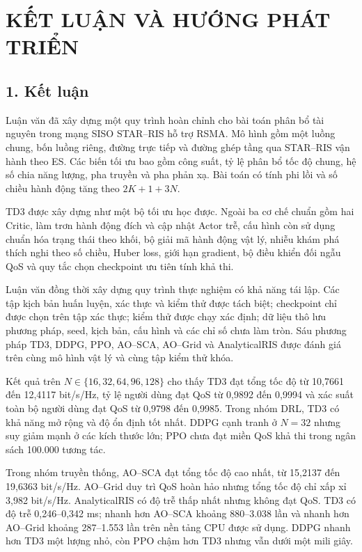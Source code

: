 \chapter*{KẾT LUẬN VÀ HƯỚNG PHÁT TRIỂN}

\section*{1. Kết luận}
Luận văn đã xây dựng một quy trình hoàn chỉnh cho bài toán phân bổ tài nguyên trong mạng SISO STAR--RIS hỗ trợ RSMA. Mô hình gồm một luồng chung, bốn luồng riêng, đường trực tiếp và đường ghép tầng qua STAR--RIS vận hành theo ES. Các biến tối ưu bao gồm công suất, tỷ lệ phân bổ tốc độ chung, hệ số chia năng lượng, pha truyền và pha phản xạ. Bài toán có tính phi lồi và số chiều hành động tăng theo $2K+1+3N$.

TD3 được xây dựng như một bộ tối ưu học được. Ngoài ba cơ chế chuẩn gồm hai Critic, làm trơn hành động đích và cập nhật Actor trễ, cấu hình còn sử dụng chuẩn hóa trạng thái theo khối, bộ giải mã hành động vật lý, nhiễu khám phá thích nghi theo số chiều, Huber loss, giới hạn gradient, bộ điều khiển đối ngẫu QoS và quy tắc chọn checkpoint ưu tiên tính khả thi.

Luận văn đồng thời xây dựng quy trình thực nghiệm có khả năng tái lập. Các tập kịch bản huấn luyện, xác thực và kiểm thử được tách biệt; checkpoint chỉ được chọn trên tập xác thực; kiểm thử được chạy xác định; dữ liệu thô lưu phương pháp, seed, kịch bản, cấu hình và các chỉ số chưa làm tròn. Sáu phương pháp TD3, DDPG, PPO, AO--SCA, AO--Grid và AnalyticalRIS được đánh giá trên cùng mô hình vật lý và cùng tập kiểm thử khóa.

Kết quả trên $N\in\{16,32,64,96,128\}$ cho thấy TD3 đạt tổng tốc độ từ 10,7661 đến 12,4117 bit/s/Hz, tỷ lệ người dùng đạt QoS từ 0,9892 đến 0,9994 và xác suất toàn bộ người dùng đạt QoS từ 0,9798 đến 0,9985. Trong nhóm DRL, TD3 có khả năng mở rộng và độ ổn định tốt nhất. DDPG cạnh tranh ở $N=32$ nhưng suy giảm mạnh ở các kích thước lớn; PPO chưa đạt miền QoS khả thi trong ngân sách 100.000 tương tác.

Trong nhóm truyền thống, AO--SCA đạt tổng tốc độ cao nhất, từ 15,2137 đến 19,6363 bit/s/Hz. AO--Grid duy trì QoS hoàn hảo nhưng tổng tốc độ chỉ xấp xỉ 3,982 bit/s/Hz. AnalyticalRIS có độ trễ thấp nhất nhưng không đạt QoS. TD3 có độ trễ 0,246--0,342 ms; nhanh hơn AO--SCA khoảng 880--3.038 lần và nhanh hơn AO--Grid khoảng 287--1.553 lần trên nền tảng CPU được sử dụng. DDPG nhanh hơn TD3 một lượng nhỏ, còn PPO chậm hơn TD3 nhưng vẫn dưới một mili giây.

